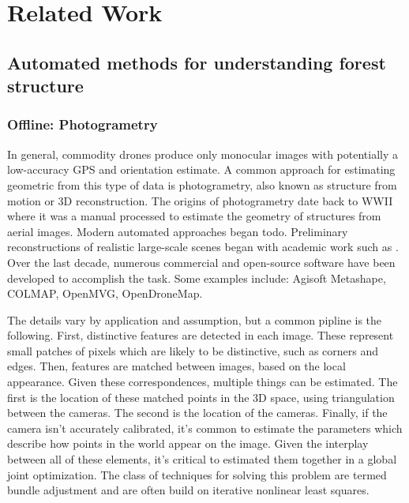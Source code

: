 
\chapter{Related Work} \label{chapRelated}


\section{Automated methods for understanding forest structure}
\subsection{Offline: Photogrametry}
In general, commodity drones produce only monocular images with potentially a low-accuracy GPS and orientation estimate. A common approach for estimating geometric from this type of data is photogrametry, also known as structure from motion or 3D reconstruction. The origins of photogrametry date back to WWII where it was a manual processed to estimate the geometry of structures from aerial images. Modern automated approaches began todo. Preliminary reconstructions of realistic large-scale scenes began with academic work such as \cite{Agarwal2009}. Over the last decade, numerous commercial and open-source software have been developed to accomplish the task. Some examples include: Agisoft Metashape, COLMAP, OpenMVG, OpenDroneMap.

The details vary by application and assumption, but a common pipline is the following. First, distinctive features are detected in each image. These represent small patches of pixels which are likely to be distinctive, such as corners and edges. Then, features are matched between images, based on the local appearance. 
Given these correspondences, multiple things can be estimated. The first is the location of these matched points in the 3D space, using triangulation between the cameras. The second is the location of the cameras. Finally, if the camera isn't accurately calibrated, it's common to estimate the parameters which describe how points in the world appear on the image. Given the interplay between all of these elements, it's critical to estimated them together in a global joint optimization. The class of techniques for solving this problem are termed bundle adjustment and are often build on iterative nonlinear least squares. 

